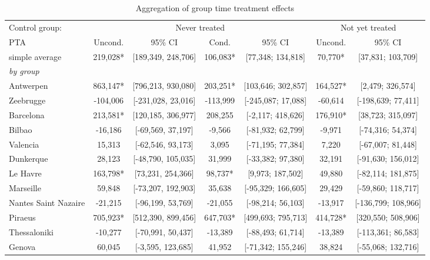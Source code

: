 \begin{table}[ht]
\centering
\caption{Aggregation of group time treatment effects} 
\begingroup\begin{adjustbox}{max width=\textwidth}
\begin{tabular}{lcccccc}
  \hline
\hline
Control group: & \multicolumn{4}{c}{Never treated} & \multicolumn{2}{c}{Not yet treated} \\
 \cmidrule(lr){2-5} \cmidrule(lr){6-7}  PTA & Uncond. & 95\% CI & Cond. & 95\% CI & Uncond. & 95\% CI  \\ 
  \hline
simple average &   219,028* & [189,349, 248,706] &  106,083* & [77,348; 134,818] &  70,770* & [37,831; 103,709] \\ 
   [1ex]\emph{by group} &  &  &  &  &  &  \\ 
   \hline
Antwerpen &   863,147* & [796,213, 930,080] &  203,251* & [103,646; 302,857] & 164,527* & [2,479; 326,574] \\ 
  Zeebrugge &  -104,006 & [-231,028, 23,016] & -113,999 & [-245,087; 17,088] & -60,614 & [-198,639; 77,411] \\ 
  Barcelona &   213,581* & [120,185, 306,977] &  208,255 & [-2,117; 418,626] & 176,910* & [38,723; 315,097] \\ 
  Bilbao &   -16,186 & [-69,569, 37,197] &   -9,566 & [-81,932; 62,799] &  -9,971 & [-74,316; 54,374] \\ 
  Valencia &    15,313 & [-62,546, 93,173] &    3,095 & [-71,195; 77,384] &   7,220 & [-67,007; 81,448] \\ 
  Dunkerque &    28,123 & [-48,790, 105,035] &   31,999 & [-33,382; 97,380] &  32,191 & [-91,630; 156,012] \\ 
  Le Havre &   163,798* & [73,231, 254,366] &   98,737* & [9,973; 187,502] &  49,880 & [-82,114; 181,875] \\ 
  Marseille &    59,848 & [-73,207, 192,903] &   35,638 & [-95,329; 166,605] &  29,429 & [-59,860; 118,717] \\ 
  Nantes Saint Nazaire &   -21,215 & [-96,199, 53,769] &  -21,055 & [-98,214; 56,103] & -13,917 & [-136,799; 108,966] \\ 
  Piraeus &   705,923* & [512,390, 899,456] &  647,703* & [499,693; 795,713] & 414,728* & [320,550; 508,906] \\ 
  Thessaloniki &   -10,277 & [-70,991, 50,437] &  -13,389 & [-88,493; 61,714] & -13,389 & [-113,361; 86,583] \\ 
  Genova &    60,045 & [-3,595, 123,685] &   41,952 & [-71,342; 155,246] &  38,824 & [-55,068; 132,716] \\ 

\end{tabular}
\end{adjustbox}
\end{table}
